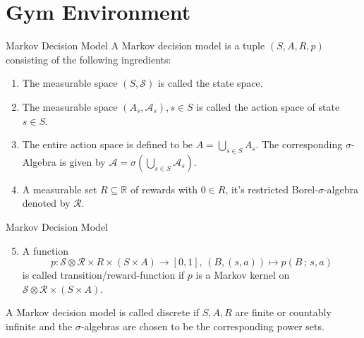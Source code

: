 \section{Gym Environment}
\begin{frame}
    \begin{ldef}{Markov Decision Model}
        A Markov decision model is a tuple $(S,A,R,p)$ consisting of the following ingredients: 
        \begin{enumerate}
            \item The measurable space $(S,\mathcal{S})$ is called the state space.
            \item The measurable space $(A_s,\mathcal{A}_s),s\in S$ is called the action space of state $s\in S$.
            \item The entire action space is defined to be $A = \bigcup\limits_{s \in S}A_s$. The corresponding $\sigma$-Algebra is given by $\mathcal{A} = \sigma(\bigcup\limits_{s\in S}\mathcal{A}_s)$.
            \item A measurable set $R \subseteq \mathbb{R}$ of rewards with $0 \in R$, it's restricted Borel-$\sigma$-algebra denoted by $\mathcal{R}$.
        \end{enumerate}
    \end{ldef}
\end{frame}
\begin{frame}
    \begin{ldef}{Markov Decision Model}
        \begin{enumerate}
            \setcounter{enumi}{4}
            \item A function \[p: \mathcal{S} \otimes  \mathcal{R}\times R \times (S \times A)\to [0,1],\, (B,(s,a)) \mapsto p(B\,;\, s,a)\] is called transition/reward-function if $p$ is a Markov kernel on $ \mathcal{S} \otimes \mathcal{R} \times (S \times A)$.
        \end{enumerate}
        A Markov decision model is called discrete if $S, A, R$ are finite or countably infinite and the $\sigma$-algebras are chosen to be the corresponding power sets.		
    \end{ldef}
\end{frame}
